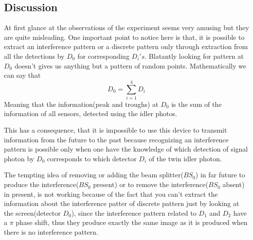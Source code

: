     \subsection{Discussion}
    At first glance at the observations of the experiment seems very amusing but they are quite misleading. One important point to notice here is that, it is possible to extract an interference pattern or a discrete pattern only through extraction from all the detections by $D_0$ for corresponding $D_i 's$. Blatantly looking for pattern at $D_0$ doesn't gives us anything but a pattern of random points. Mathematically we can say that
    \begin{equation*}
        D_0 = \sum_{i=1}^{4}D_i
    \end{equation*}
    Meaning that the information(peak and troughs) at $D_0$ is the sum of the information of all sensors, detected using the idler photos. \\
    \par This has a consequence, that it is impossible to use this device to transmit information from the future to the past because recognizing an interference pattern is possible only when one have the knowledge of which detection of signal photon by $D_0$ corresponds to which detector $D_i$ of the twin idler photon. \\
    \par The tempting idea of removing or adding the beam splitter($BS_0$) in far future to produce the interference($BS_0$ present) or to remove the interference($BS_0$ absent) in present, is not working because of the fact that you can't extract the information about the interference patter of discrete pattern just by looking at the screen(detector $D_0$), since the interference pattern related to $D_1$ and $D_2$ have a $\pi$ phase shift, thus they produce exactly the same image as it is produced when there is no interference pattern.
